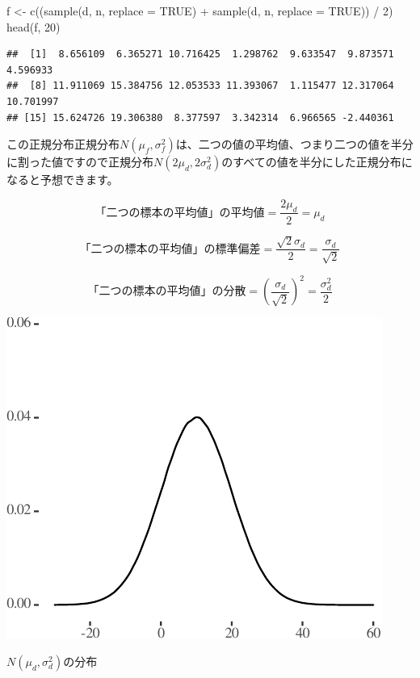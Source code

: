 \documentclass[]{tufte-handout}
\newenvironment{Shaded}{}{}
\newcommand{\AttributeTok}[1]{\textcolor[rgb]{0.49,0.56,0.16}{#1}}
\newcommand{\ConstantTok}[1]{\textcolor[rgb]{0.53,0.00,0.00}{#1}}
\newcommand{\DecValTok}[1]{\textcolor[rgb]{0.25,0.63,0.44}{#1}}
\newcommand{\FunctionTok}[1]{\textcolor[rgb]{0.02,0.16,0.49}{#1}}
\newcommand{\NormalTok}[1]{#1}
\newcommand{\OtherTok}[1]{\textcolor[rgb]{0.00,0.44,0.13}{#1}}
\newcommand{\SpecialCharTok}[1]{\textcolor[rgb]{0.25,0.44,0.63}{#1}}
\begin{document}
\begin{Shaded}
\begin{Highlighting}[numbers=left,,]
\NormalTok{f }\OtherTok{\textless{}{-}} \FunctionTok{c}\NormalTok{((}\FunctionTok{sample}\NormalTok{(d, n, }\AttributeTok{replace =} \ConstantTok{TRUE}\NormalTok{) }\SpecialCharTok{+} \FunctionTok{sample}\NormalTok{(d, n, }\AttributeTok{replace =} \ConstantTok{TRUE}\NormalTok{)) }\SpecialCharTok{/} \DecValTok{2}\NormalTok{)}
\FunctionTok{head}\NormalTok{(f, }\DecValTok{20}\NormalTok{)}
\end{Highlighting}
\end{Shaded}

\begin{verbatim}
##  [1]  8.656109  6.365271 10.716425  1.298762  9.633547  9.873571  4.596933
##  [8] 11.911069 15.384756 12.053533 11.393067  1.115477 12.317064 10.701997
## [15] 15.624726 19.306380  8.377597  3.342314  6.966565 -2.440361
\end{verbatim}

この正規分布正規分布\(N(\mu_f, \sigma^2_f)\)は、二つの値の平均値、つまり二つの値を半分に割った値ですので正規分布\(N(2\mu_d, 2\sigma^2_d)\)のすべての値を半分にした正規分布になると予想できます。

\[\mbox{「二つの標本の平均値」の平均値} = \frac{2\mu_d}{2} = \mu_d\]

\[\mbox{「二つの標本の平均値」の標準偏差} = \frac{\sqrt{2}\sigma_d}{2} = \frac{\sigma_d}{\sqrt{2}}\]

\[\mbox{「二つの標本の平均値」の分散} = (\frac{\sigma_d}{\sqrt{2}})^2 = \frac{\sigma^2_d}{2}\]

\begin{marginfigure}

{\centering \includegraphics{AdditivityOfVariance_files/figure-latex/unnamed-chunk-11-1} 

}

\caption[$N(\mu_d, \sigma^2_d)$の分布]{$N(\mu_d, \sigma^2_d)$の分布}\label{fig:unnamed-chunk-11}
\end{marginfigure}
\end{document}

